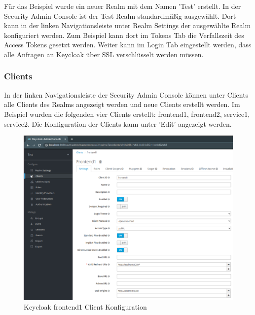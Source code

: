 Für das Beispiel wurde ein neuer Realm mit dem Namen 'Test' erstellt. In der Security Admin Console ist der Test Realm standardmäßig ausgewählt. Dort kann in der linken Navigationsleiste unter Realm Settings der ausgewählte Realm konfiguriert werden. Zum Beispiel kann dort im Tokens Tab die Verfallszeit des Access Tokens gesetzt werden. Weiter kann im Login Tab eingestellt werden, dass alle Anfragen an Keycloak über SSL verschlüsselt werden müssen. %

\subsubsection{Clients}

In der linken Navigationsleiste der Security Admin Console können unter Clients alle Clients des Realms angezeigt werden und neue Clients erstellt werden. Im Beispiel wurden die folgenden vier Clients erstellt: frontend1, frontend2, service1, service2. Die Konfiguration der Clients kann unter 'Edit' angezeigt werden.

\begin{figure}[!h]
	\centering
	\includegraphics[width=1\textwidth]{Images/Ebert/KeycloakClientConfig.PNG}
	\caption{Keycloak frontend1 Client Konfiguration}
	\label{fig:EB_Keycloak frontend1 Client Konfiguration}
\end{figure}

